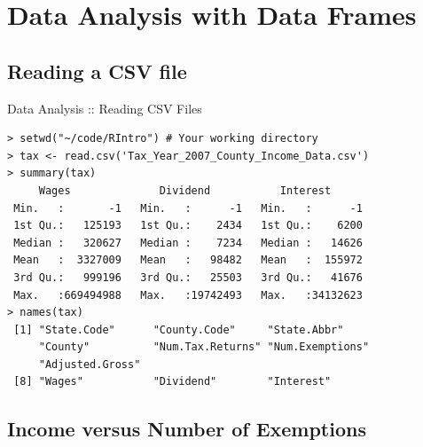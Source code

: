 \documentclass{beamer}
\begin{document}
\section{Data Analysis with Data Frames}

\subsection{Reading a CSV file}

\begin{frame}[fragile]{Data Analysis :: Reading CSV Files}

\begin{footnotesize}
\begin{verbatim}
> setwd("~/code/RIntro") # Your working directory
> tax <- read.csv('Tax_Year_2007_County_Income_Data.csv')
> summary(tax)
     Wages              Dividend           Interest       
 Min.   :       -1   Min.   :      -1   Min.   :      -1  
 1st Qu.:   125193   1st Qu.:    2434   1st Qu.:    6200  
 Median :   320627   Median :    7234   Median :   14626  
 Mean   :  3327009   Mean   :   98482   Mean   :  155972  
 3rd Qu.:   999196   3rd Qu.:   25503   3rd Qu.:   41676  
 Max.   :669494988   Max.   :19742493   Max.   :34132623
> names(tax)
 [1] "State.Code"      "County.Code"     "State.Abbr"
     "County"          "Num.Tax.Returns" "Num.Exemptions"
     "Adjusted.Gross" 
 [8] "Wages"           "Dividend"        "Interest"       
\end{verbatim}
\end{footnotesize}

\end{frame}

\subsection{Income versus Number of Exemptions}
\end{document}
